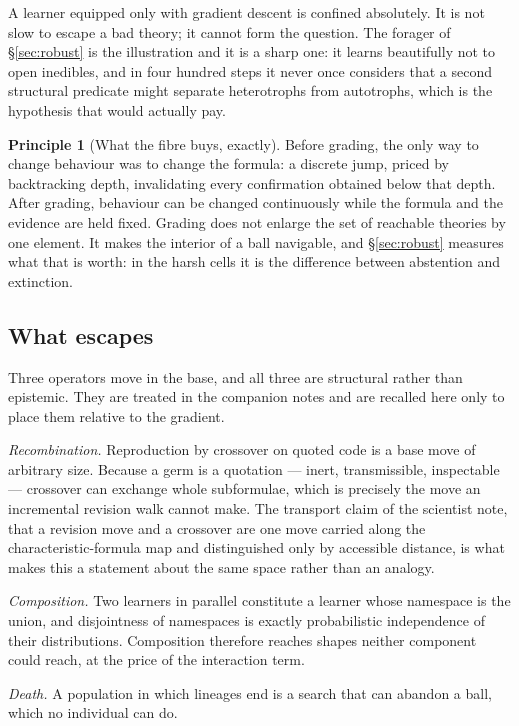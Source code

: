 \documentclass[11pt,a4paper]{article}
\theoremstyle{plain}
\theoremstyle{definition}
\newtheorem{principle}[theorem]{Principle}
\theoremstyle{remark}
\begin{document}
A learner equipped only with gradient descent is confined absolutely. It is not
slow to escape a bad theory; it cannot form the question. The forager of
\S\ref{sec:robust} is the illustration and it is a sharp one: it learns
beautifully not to open inedibles, and in four hundred steps it never once
considers that a second structural predicate might separate heterotrophs from
autotrophs, which is the hypothesis that would actually pay.

\begin{principle}[What the fibre buys, exactly]\label{prin:fibrebuy}
Before grading, the only way to change behaviour was to change the formula: a
discrete jump, priced by backtracking depth, invalidating every confirmation
obtained below that depth. After grading, behaviour can be changed continuously
while the formula and the evidence are held fixed. Grading does not enlarge the
set of reachable theories by one element. It makes the interior of a ball
navigable, and \S\ref{sec:robust} measures what that is worth: in the harsh cells
it is the difference between abstention and extinction.
\end{principle}

\subsection{What escapes}

Three operators move in the base, and all three are structural rather than
epistemic. They are treated in the companion notes and are recalled here only to
place them relative to the gradient.

\emph{Recombination.} Reproduction by crossover on quoted code is a base move of
arbitrary size. Because a germ is a quotation --- inert, transmissible,
inspectable --- crossover can exchange whole subformulae, which is precisely the
move an incremental revision walk cannot make. The transport claim of the
scientist note, that a revision move and a crossover are one move carried along
the characteristic-formula map and distinguished only by accessible distance, is
what makes this a statement about the same space rather than an analogy.

\emph{Composition.} Two learners in parallel constitute a learner whose namespace
is the union, and disjointness of namespaces is exactly probabilistic
independence of their distributions. Composition therefore reaches shapes neither
component could reach, at the price of the interaction term.

\emph{Death.} A population in which lineages end is a search that can abandon a
ball, which no individual can do.
\end{document}
